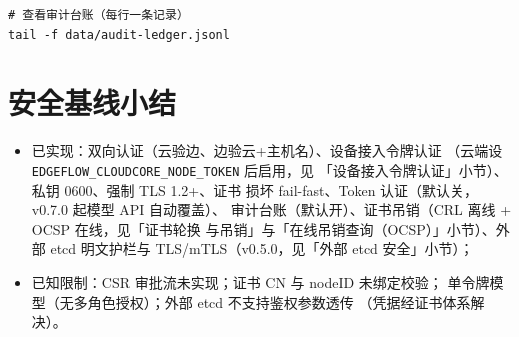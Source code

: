 \begin{lstlisting}
# 查看审计台账（每行一条记录）
tail -f data/audit-ledger.jsonl
\end{lstlisting}

\section{安全基线小结}

\begin{itemize}
  \item 已实现：双向认证（云验边、边验云+主机名）、设备接入令牌认证
        （云端设 \texttt{EDGEFLOW\_CLOUDCORE\_NODE\_TOKEN} 后启用，见
        「设备接入令牌认证」小节）、私钥 0600、强制 TLS 1.2+、证书
        损坏 fail-fast、Token 认证（默认关，v0.7.0 起模型 API 自动覆盖）、
        审计台账（默认开）、证书吊销（CRL 离线 + OCSP 在线，见「证书轮换
        与吊销」与「在线吊销查询（OCSP）」小节）、外部 etcd 明文护栏与
        TLS/mTLS（v0.5.0，见「外部 etcd 安全」小节）；
  \item 已知限制：CSR 审批流未实现；证书 CN 与 nodeID 未绑定校验；
        单令牌模型（无多角色授权）；外部 etcd 不支持鉴权参数透传
        （凭据经证书体系解决）。
\end{itemize}
